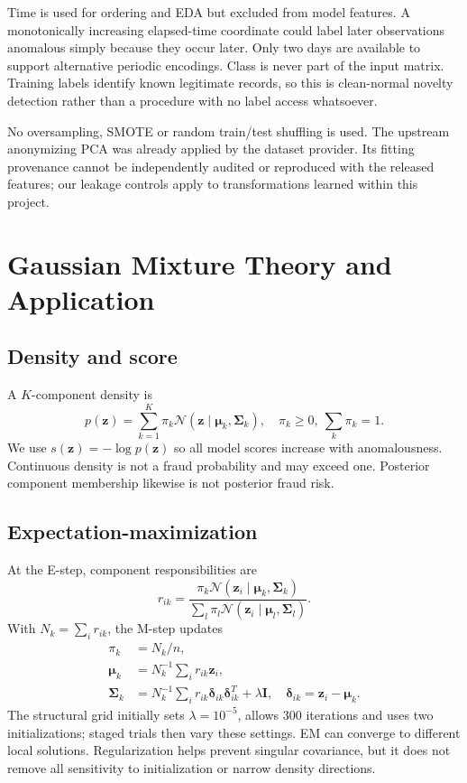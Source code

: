 \documentclass[conference]{IEEEtran}
\begin{document}
Time is used for ordering and EDA but excluded from model features. A monotonically increasing elapsed-time coordinate could label later observations anomalous simply because they occur later. Only two days are available to support alternative periodic encodings. Class is never part of the input matrix. Training labels identify known legitimate records, so this is clean-normal novelty detection rather than a procedure with no label access whatsoever.

No oversampling, SMOTE or random train/test shuffling is used. The upstream anonymizing PCA was already applied by the dataset provider. Its fitting provenance cannot be independently audited or reproduced with the released features; our leakage controls apply to transformations learned within this project.

\section{Gaussian Mixture Theory and Application}
\subsection{Density and score}
A $K$-component density is
\begin{equation}
p(\mathbf z)=\sum_{k=1}^{K}\pi_k\mathcal N(\mathbf z\mid\boldsymbol\mu_k,\boldsymbol\Sigma_k),
\quad \pi_k\geq0,\ \sum_k\pi_k=1.
\end{equation}
We use $s(\mathbf z)=-\log p(\mathbf z)$ so all model scores increase with anomalousness. Continuous density is not a fraud probability and may exceed one. Posterior component membership likewise is not posterior fraud risk.

\subsection{Expectation-maximization}
At the E-step, component responsibilities are
\begin{equation}
r_{ik}=\frac{\pi_k\mathcal N(\mathbf z_i\mid\boldsymbol\mu_k,\boldsymbol\Sigma_k)}{\sum_l\pi_l\mathcal N(\mathbf z_i\mid\boldsymbol\mu_l,\boldsymbol\Sigma_l)}.
\end{equation}
With $N_k=\sum_i r_{ik}$, the M-step updates
\begin{align}
\pi_k&=N_k/n,\\
\boldsymbol\mu_k&=N_k^{-1}\sum_i r_{ik}\mathbf z_i,\\
\boldsymbol\Sigma_k&=N_k^{-1}\sum_i r_{ik}\boldsymbol\delta_{ik}\boldsymbol\delta_{ik}^T+\lambda\mathbf I,\quad\boldsymbol\delta_{ik}=\mathbf z_i-\boldsymbol\mu_k.
\end{align}
The structural grid initially sets $\lambda=10^{-5}$, allows 300 iterations and uses two initializations; staged trials then vary these settings. EM can converge to different local solutions. Regularization helps prevent singular covariance, but it does not remove all sensitivity to initialization or narrow density directions.
\end{document}
